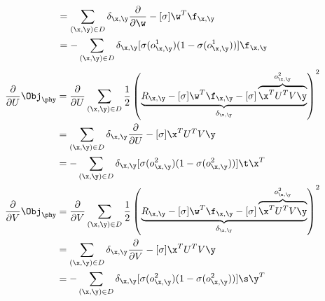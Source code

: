 \begin{itemize}
\begin{align*}
& = \sum_{(\x,\y) \in D} \delta_{\x,\y} \frac{\partial}{\partial \w} - [\sigma] \w^T \f_{\x,\y} \\
& = - \sum_{(\x,\y) \in D} \delta_{\x,\y} [\sigma(o^1_{\x,\y}) (1 - \sigma(o^1_{\x,\y}))] \f_{\x,\y} 
\end{align*}
\begin{align*}
\frac{\partial}{\partial U} \Obj_\phy & = \frac{\partial}{\partial U} \sum_{(\x,\y) \in D} \frac{1}{2} \left( \underbrace{R_{\x,\y} - [\sigma] \w^T \f_{\x,\y} - [\sigma] \overbrace{\x^T U^T V\y}^{o^2_{\x,\y}}}_{\delta_{\x,\y}}\right)^2 \\
& = \sum_{(\x,\y) \in D} \delta_{\x,\y} \frac{\partial}{\partial U} - [\sigma] \x^T U^T V\y \\
& = - \sum_{(\x,\y) \in D} \delta_{\x,\y} [\sigma(o^2_{\x,\y}) (1 - \sigma(o^2_{\x,\y}))] \t \x^T\\
\frac{\partial}{\partial V} \Obj_\phy & = \frac{\partial}{\partial V} \sum_{(\x,\y) \in D} \frac{1}{2} \left( \underbrace{R_{\x,\y} - [\sigma] \w^T \f_{\x,\y} - [\sigma] \overbrace{\x^T U^T V\y}^{o^2_{\x,\y}}}_{\delta_{\x,\y}}\right)^2 \\
& = \sum_{(\x,\y) \in D}  \delta_{\x,\y} \frac{\partial}{\partial V} - [\sigma] \x^T U^T V\y \\
& = - \sum_{(\x,\y) \in D}  \delta_{\x,\y} [\sigma(o^2_{\x,\y}) (1 - \sigma(o^2_{\x,\y}))] \s \y^T \\
\end{align*}
\end{itemize}

